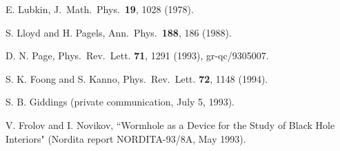 \documentclass[12pt]{article}
\begin{document}
\begin{thebibliography}{999}
 E. Lubkin, J.\ Math.\ Phys.\ {\bf 19}, 1028 (1978).

 S. Lloyd and H. Pagels, Ann.\ Phys.\ {\bf 188}, 186
(1988).

 D. N. Page, Phys.\ Rev.\ Lett. {\bf 71}, 1291
(1993),
gr-qc/9305007.

 S. K. Foong and S. Kanno, Phys.\ Rev.\ Lett. {\bf
72}, 1148 (1994).

 S. B. Giddings (private communication, July 5,
1993).

 V. Frolov and I. Novikov, ``Wormhole as a Device for
the
Study of Black Hole Interiors" (Nordita report NORDITA-93/8A, May
1993).

	\end{thebibliography}
\end{document}
